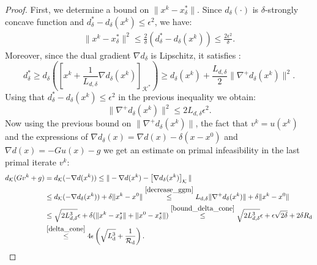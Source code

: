 \documentclass{gOMS2e}
\theoremstyle{plain}
\theoremstyle{definition}
\theoremstyle{remark}
\begin{document}
\begin{proof}
\noindent First,  we determine a bound on $\|x^k - x^*_\delta\|$.
 Since $d_\delta (\cdot)$ is $\delta$-strongly concave function and
$d_\delta^* - d_\delta(x^k) \leq   \epsilon^2$, we have:
\begin{align}
\label{bound_delta_cone} \|x^k - x^*_\delta \|^2 \leq
\frac{2}{\delta} (d_\delta^* - d_\delta (x^k)) \leq \frac{2
\epsilon^2}{\delta}.
\end{align}
Moreover, since  the dual gradient $\nabla d_{\delta}$ is Lipschitz,
it    satisfies \cite{Nes:04}:
\[ d^*_{\delta} \geq d_\delta \left( \left[ x^k + \frac{1}{L_{d,\delta}} \nabla d_\delta(x^k) \right]_{\mathcal{K}^*} \right)
\geq d_\delta (x^k) + \frac{L_{d,\delta}}{2} \|\nabla^+ d_\delta
(x^k)\|^2.
\]
Using that $d_\delta^* - d_\delta(x^k) \leq   \epsilon^2$ in the
previous inequality we obtain:
\[  \|\nabla^+ d_\delta (x^k)\|^2 \leq 2 L_{d,\delta} \epsilon^2.  \]
\noindent Now using the previous bound on $\|\nabla^+ d_\delta
(x^k)\|$, the fact that $v^k = u(x^k)$ and  the expressions  of
$\nabla d_\delta(x) = \nabla d(x) - \delta (x - x^0)$ and $\nabla
d(x) = - G u(x) - g$ we get an estimate on primal infeasibility in
the last primal iterate $v^k$:
\begin{align*}
 d_{\mathcal{K}}(G v^k + g) &  = d_{\mathcal{K}}(- \nabla d(x^k)) \le \| - \nabla d(x^k) -  \left[\nabla d_{\delta}(x^k) \right]_{\mathcal{K}}\| \\
& \le d_{\mathcal{K}}(- \nabla d_\delta (x^k)) + \delta \|x^k - x^0\|
\overset{\eqref{decrease_ggm}}{\le} L_{\text{d},\delta} \| \nabla^+
d_\delta (x^k)\| + \delta \|x^k - x^0\| \\
& \leq \sqrt{2 L_{d,\delta}^3} \epsilon + \delta (\|x^k -
x^*_\delta\| + \|x^0 - x^*_\delta\|)
\overset{\eqref{bound_delta_cone}}{\leq} \sqrt{2 L_{d,\delta}^3}
\epsilon + \epsilon \sqrt{2 \delta} + 2 \delta  R_\text{d} \\
& \overset{\eqref{delta_cone}}{\leq} 4\epsilon
\left(\sqrt{L_\text{d}^3} + \frac{1}{\mathcal{R}_{\text{d}}}
\right).
\end{align*}


\end{proof}
\end{document}
